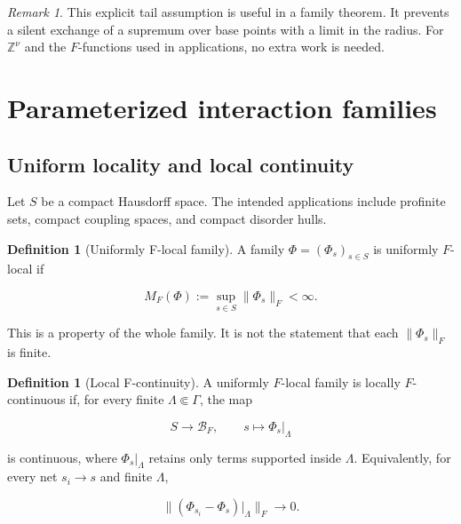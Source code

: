 \documentclass[12pt]{article}
\theoremstyle{definition}
\newtheorem{definition}[theorem]{Definition}
\theoremstyle{remark}
\newtheorem{remark}[theorem]{Remark}
\begin{document}
\begin{remark}
This explicit tail assumption is useful in a family theorem.  It prevents a
silent exchange of a supremum over base points with a limit in the radius.
For $\mathbb Z^\nu$ and the $F$-functions used in applications, no extra work
is needed.
\end{remark}

\section{Parameterized interaction families}

\subsection{Uniform locality and local continuity}

Let $S$ be a compact Hausdorff space.  The intended applications include
profinite sets, compact coupling spaces, and compact disorder hulls.

\begin{definition}[Uniformly F-local family]
A family $\Phi=(\Phi_s)_{s\in S}$ is uniformly $F$-local if

\begin{equation}
  M_F(\Phi):=\sup_{s\in S}\|\Phi_s\|_F<\infty.
  \label{eq:family-M}
\end{equation}
\end{definition}

This is a property of the whole family.  It is not the statement that each
$\|\Phi_s\|_F$ is finite.

\begin{definition}[Local F-continuity]
A uniformly $F$-local family is locally $F$-continuous if, for every finite
$\Lambda\Subset\Gamma$, the map

\begin{equation}
  S\longrightarrow\mathcal B_F,
  \qquad
  s\longmapsto\Phi_s|_\Lambda
\end{equation}

is continuous, where $\Phi_s|_\Lambda$ retains only terms supported inside
$\Lambda$.  Equivalently, for every net $s_i\to s$ and finite $\Lambda$,

\begin{equation}
  \| (\Phi_{s_i}-\Phi_s)|_\Lambda\|_F\longrightarrow0.
  \label{eq:local-F-cont}
\end{equation}
\end{definition}
\end{document}

